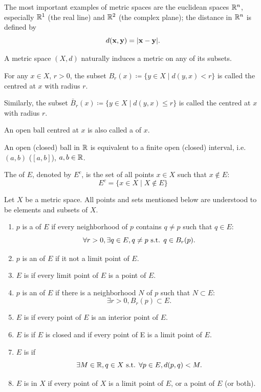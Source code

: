 \begin{example}
The most important examples of metric spaces are the euclidean spaces $\mathbb R^n$, especially $\mathbb R^1$ (the real line) and $\mathbb R^2$ (the complex plane); the distance in $\mathbb R^n$ is defined by
\[ d(\vb{x},\vb{y})=|\vb{x}-\vb{y}|. \]
\end{example}

A metric space $(X,d)$ naturally induces a metric on any of its subsets.

\begin{definition}
For any $x\in X$, $r>0$, the subset $B_r(x)\coloneqq\{y\in X\mid d(y,x)<r\}$ is called the  centred at $x$ with radius $r$.

Similarly, the subset $\bar{B}_r(x)\coloneqq\{y\in X\mid d(y,x)\le r\}$ is called the  centred at $x$ with radius $r$.
\end{definition}

An open ball centred at $x$ is also called a  of $x$.

\begin{example}
An open (closed) ball in $\mathbb R$ is equivalent to a finite open (closed) interval, i.e. $(a,b)$ ($[a,b]$), $a,b\in\mathbb R$.
\end{example}

The  of $E$, denoted by $E^c$, is the set of all points $x \in X$ such that $x\notin E$:
\[E^c=\{x\in X\mid X\notin E\}\]

\begin{definition}
Let $X$ be a metric space. All points and sets mentioned below are understood to be elements and subsets of $X$.
\begin{enumerate}[label=(\arabic*)]
\item $p$ is a  of $E$ if every neighborhood of $p$ contains $q\neq p$ such that $q\in E$:
\[ \forall r>0,\exists q\in E, q\neq p\text{ s.t. } q\in B_r(p). \]
\item $p$ is an  of $E$ if it not a limit point of $E$.
\item $E$ is  if every limit point of $E$ is a point of $E$.
\item $p$ is an  of $E$ if there is a neighborhood $N$ of $p$ such that $N\subset E$:
\[ \exists r>0, B_r(p)\subset E. \]
\item $E$ is  if every point of $E$ is an interior point of $E$.
\item $E$ is  if $E$ is closed and if every point of E is a limit point of $E$.
\item $E$ is  if 
\[ \exists M\in\mathbb R, q\in X\text{ s.t. }\forall p\in E, d(p,q)<M. \]
\item $E$ is  in $X$ if every point of $X$ is a limit point of $E$, or a point of $E$ (or both). 
\end{enumerate}
\end{definition}


